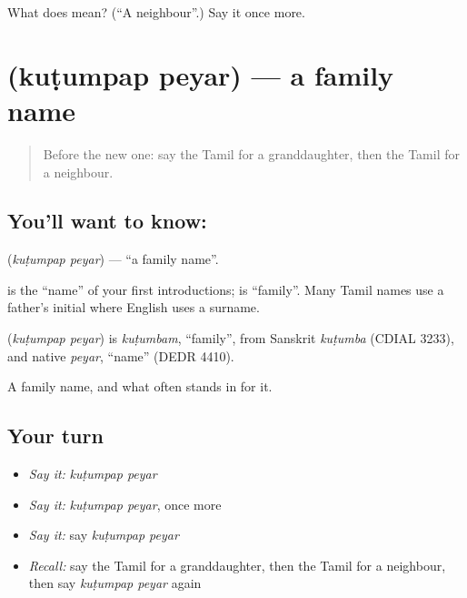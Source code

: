\begin{tcolorbox}[breakable,colback=teal!4,colframe=teal!35!black,title={Before you move on}]
What does   mean? (\textquotedblleft{}A neighbour\textquotedblright{}.) Say it once more.
\end{tcolorbox}
\section[\texorpdfstring{\ta{குடும்பப்} \ta{பெயர்} (kuṭumpap peyar)}{குடும்பப் பெயர் (kuṭumpap peyar)}]{  (kuṭumpap peyar) — a family name}

\label{lesson:TA-C103-familyname}



\begin{quote}
Before the new one: say the Tamil for a granddaughter, then the Tamil for a neighbour.
\end{quote}

\subsection*{You'll want to know:  }
\textbf{ } (\emph{kuṭumpap peyar}) — \textquotedblleft{}a family name\textquotedblright{}.

\textbf{} is the \textquotedblleft{}name\textquotedblright{} of your first introductions; \textbf{} is \textquotedblleft{}family\textquotedblright{}. Many Tamil names use a father's initial where English uses a surname.

\begin{cousinweb}
\textbf{ } (\emph{kuṭumpap peyar}) is \emph{kuṭumbam}, \textquotedblleft{}family\textquotedblright{}, from Sanskrit \emph{kuṭumba} (CDIAL 3233), and native \emph{peyar}, \textquotedblleft{}name\textquotedblright{} (DEDR 4410).
\end{cousinweb}

\begin{grammarlens}[title={What you've built}]
A family name, and what often stands in for it.
\end{grammarlens}

\subsection*{Your turn}
\begin{itemize}
\raggedright
  \item \emph{Say it:} \emph{kuṭumpap peyar}
  \item \emph{Say it:} \emph{kuṭumpap peyar}, once more
  \item \emph{Say it:} say \emph{kuṭumpap peyar}
  \item \emph{Recall:} say the Tamil for a granddaughter, then the Tamil for a neighbour, then say \emph{kuṭumpap peyar} again
\end{itemize}

